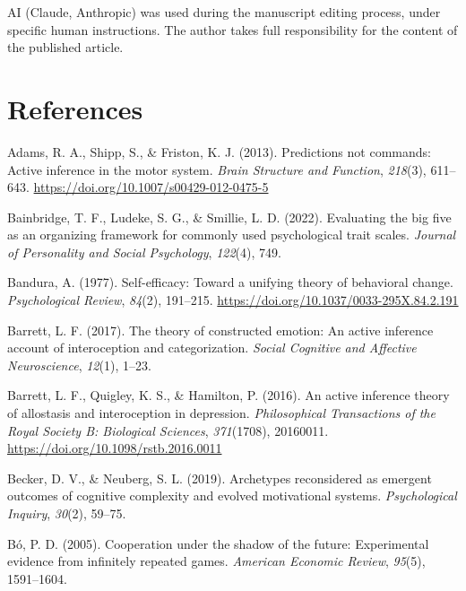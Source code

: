 \documentclass[
  jou,
  floatsintext,
  longtable,
  nolmodern,
  notxfonts,
  notimes,
  12pt,
  colorlinks=true,linkcolor=blue,citecolor=blue,urlcolor=blue]{apa7}
\newlength{\cslhangindent}
\newenvironment{CSLReferences}[2] %
 {\begin{list}{}{%
  \setlength{\itemindent}{0pt}
  \setlength{\leftmargin}{0pt}
  \setlength{\parsep}{0pt}
  \ifodd #1
   \setlength{\leftmargin}{\cslhangindent}
   \setlength{\itemindent}{-1\cslhangindent}
  \fi
  \setlength{\itemsep}{#2\baselineskip}}}
 {\end{list}}
\begin{document}
AI (Claude, Anthropic) was used during the manuscript editing process,
under specific human instructions. The author takes full responsibility
for the content of the published article.

\section{References}\label{references}

\protect{}\label{refs}
\begin{CSLReferences}{1}{0}
Adams, R. A., Shipp, S., \& Friston, K. J. (2013). Predictions not
commands: Active inference in the motor system. \emph{Brain Structure
and Function}, \emph{218}(3), 611--643.
\url{https://doi.org/10.1007/s00429-012-0475-5}

Bainbridge, T. F., Ludeke, S. G., \& Smillie, L. D. (2022). Evaluating
the big five as an organizing framework for commonly used psychological
trait scales. \emph{Journal of Personality and Social Psychology},
\emph{122}(4), 749.

Bandura, A. (1977). Self-efficacy: Toward a unifying theory of
behavioral change. \emph{Psychological Review}, \emph{84}(2), 191--215.
\url{https://doi.org/10.1037/0033-295X.84.2.191}

Barrett, L. F. (2017). The theory of constructed emotion: An active
inference account of interoception and categorization. \emph{Social
Cognitive and Affective Neuroscience}, \emph{12}(1), 1--23.

Barrett, L. F., Quigley, K. S., \& Hamilton, P. (2016). An active
inference theory of allostasis and interoception in depression.
\emph{Philosophical Transactions of the Royal Society B: Biological
Sciences}, \emph{371}(1708), 20160011.
\url{https://doi.org/10.1098/rstb.2016.0011}

Becker, D. V., \& Neuberg, S. L. (2019). Archetypes reconsidered as
emergent outcomes of cognitive complexity and evolved motivational
systems. \emph{Psychological Inquiry}, \emph{30}(2), 59--75.

Bó, P. D. (2005). Cooperation under the shadow of the future:
Experimental evidence from infinitely repeated games. \emph{American
Economic Review}, \emph{95}(5), 1591--1604.


\end{CSLReferences}
\end{document}
